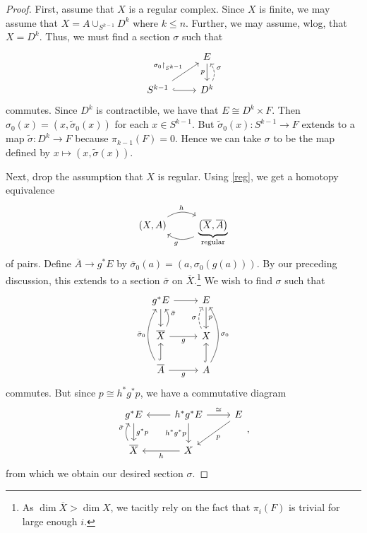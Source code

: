 \documentclass[10pt,letterpaper,cm]{nupset}
\theoremstyle{definition}
\theoremstyle{theorem}
\theoremstyle{remark}
\newcommand{\1}{\mathbb{1}}
\newcommand{\0}{\vec 0}
\begin{document}
\begin{proof}
First, assume that $X$ is a regular complex. Since $X$ is finite, we may assume that $X= A \cup_{S^{k-1}}D^k$ where $k\leq n$. Further, we may assume, wlog, that $X = D^k$. Thus, we must find a section $\sigma$ such that
\[
\begin{tikzcd}
                                                                     & E \arrow[d, "p"']                            \\
S^{k-1} \arrow[ru, "\sigma_0\restriction_{S^{k-1}}"] \arrow[r, hook] & D^k \arrow[u, "\sigma"', dashed, bend right]
\end{tikzcd}
\] commutes. Since $D^k$ is contractible, we have that $E \cong D^k \times F$. Then $\sigma_0(x) = \left(x, \tilde{\sigma}_0(x)\right)$ for each $x\in S^{k-1}$.  But $ \tilde{\sigma}_0(x) : S^{k-1} \to F$ extends to a map $\tilde{\sigma} :D^k\to F$ because $\pi_{k-1}\left(F\right)=0$. Hence we can take $\sigma$ to be the map defined by $x\mapsto  \left(x, \tilde{\sigma}(x)\right)$.

\medskip

Next, drop the assumption that $X$ is regular. Using \cref{reg}, we get a homotopy equivalence
\[
\begin{tikzcd}
{\left(X,A\right)} \arrow[r, "h", bend left] & {\underbrace{\left(\overline{X}, \overline{A}\right)}_{\text{regular}}} \arrow[l, "g", bend left]
\end{tikzcd}
\] of pairs. Define $\overline{A}\to g^{\ast}{E}$ by $\bar{\sigma}_0(a) = \left(a, \sigma_0\left(g(a)\right)\right)$. By our preceding discussion, this extends to a section $\bar{\sigma}$ on $\overline{X}$.\footnote{As $\dim{\overline{X}} >\dim{X}$, we tacitly rely on the fact that $\pi_i\left(F\right)$ is trivial for large enough $i$.}  We wish to find $\sigma$ such that
\[
\begin{tikzcd}
g^{\ast}{E} \arrow[r] \arrow[d]                                                    & E \arrow[d, "p"]                                      \\
\overline{X} \arrow[r, "g"'] \arrow[u, "\bar{\sigma}"', bend right]                  & X \arrow[u, "\sigma", dashed, bend left]              \\
\overline{A} \arrow[r, "g"'] \arrow[u, hook] \arrow[uu, "\bar{\sigma}_0", bend left] & A \arrow[u, hook] \arrow[uu, "\sigma_0"', bend right]
\end{tikzcd}
\] commutes. But since $p \cong h^{\ast}{g^{\ast}{p}}$, we have a commutative diagram
\[
\begin{tikzcd}
g^{\ast}{E} \arrow[d, "g^{\ast}{p}"]              & h^{\ast}{g^{\ast}{E}} \arrow[d, "h^{\ast}{g^{\ast}{p}}"'] \arrow[l] \arrow[r, "\cong"] & E \arrow[ld, "p"] \\
\overline{X} \arrow[u, "\bar{\sigma}", bend left] & X \arrow[l, "h"]                                                                      &                  
\end{tikzcd}
,\] from which we obtain our desired section $\sigma$.
\end{proof}
\end{document}
